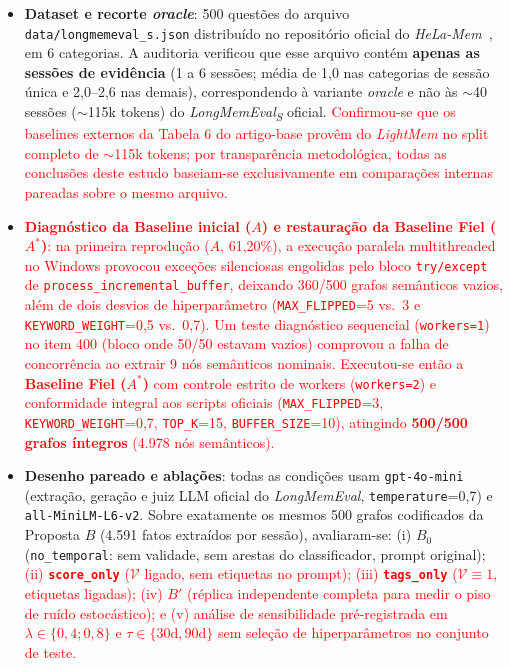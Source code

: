 \documentclass[10pt,conference,twocolumn]{IEEEtran}
\newcommand{\novo}[1]{\textcolor{red}{#1}}
\begin{document}
\begin{itemize}
    \item \textbf{Dataset e recorte \textit{oracle}}: 500 questões do arquivo \texttt{data/longmemeval\_s.json} distribuído no repositório oficial do \textit{HeLa-Mem}~\cite{longmemeval2025}, em 6 categorias. A auditoria verificou que esse arquivo contém \textbf{apenas as sessões de evidência} (1 a 6 sessões; média de 1,0 nas categorias de sessão única e 2,0--2,6 nas demais), correspondendo à variante \textit{oracle} e não às $\sim$40 sessões ($\sim$115k tokens) do \textit{LongMemEval\textsubscript{S}} oficial. \novo{Confirmou-se que os baselines externos da Tabela 6 do artigo-base provêm do \textit{LightMem} no split completo de $\sim$115k tokens; por transparência metodológica, todas as conclusões deste estudo baseiam-se exclusivamente em comparações internas pareadas sobre o mesmo arquivo.}
    \item \novo{\textbf{Diagnóstico da Baseline inicial ($A$) e restauração da Baseline Fiel ($A^*$)}: na primeira reprodução ($A$, 61,20\%), a execução paralela multithreaded no Windows provocou exceções silenciosas engolidas pelo bloco \texttt{try/except} de \texttt{process\_incremental\_buffer}, deixando 360/500 grafos semânticos vazios, além de dois desvios de hiperparâmetro (\texttt{MAX\_FLIPPED}=5 vs.\ 3 e \texttt{KEYWORD\_WEIGHT}=0,5 vs.\ 0,7). Um teste diagnóstico sequencial (\texttt{workers=1}) no item 400 (bloco onde 50/50 estavam vazios) comprovou a falha de concorrência ao extrair 9 nós semânticos nominais. Executou-se então a \textbf{Baseline Fiel ($A^*$)} com controle estrito de workers (\texttt{workers=2}) e conformidade integral aos scripts oficiais (\texttt{MAX\_FLIPPED}=3, \texttt{KEYWORD\_WEIGHT}=0,7, \texttt{TOP\_K}=15, \texttt{BUFFER\_SIZE}=10), atingindo \textbf{500/500 grafos íntegros} (4.978 nós semânticos).}
    \item \textbf{Desenho pareado e ablações}: todas as condições usam \texttt{gpt-4o-mini} (extração, geração e juiz LLM oficial do \textit{LongMemEval}, \texttt{temperature}=0,7) e \texttt{all-MiniLM-L6-v2}. Sobre exatamente os mesmos 500 grafos codificados da Proposta $B$ (4.591 fatos extraídos por sessão), avaliaram-se: (i) \textbf{$B_0$} (\texttt{no\_temporal}: sem validade, sem arestas do classificador, prompt original); \novo{(ii) \textbf{\texttt{score\_only}} ($\mathcal{V}$ ligado, sem etiquetas no prompt); (iii) \textbf{\texttt{tags\_only}} ($\mathcal{V}\equiv 1$, etiquetas ligadas); (iv) \textbf{$B'$} (réplica independente completa para medir o piso de ruído estocástico); e (v) análise de sensibilidade pré-registrada em $\lambda \in \{0{,}4; 0{,}8\}$ e $\tau \in \{30\text{d}, 90\text{d}\}$ sem seleção de hiperparâmetros no conjunto de teste.}
\end{itemize}
\end{document}
